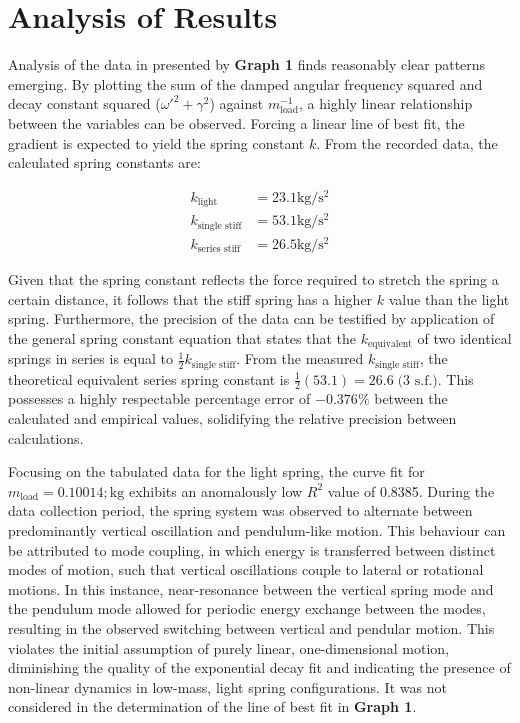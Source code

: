 \section{Analysis of Results}

Analysis of the data in presented by \textbf{Graph 1} finds reasonably clear patterns emerging. By plotting the sum of the damped angular frequency squared and decay constant squared ($\omega'^2 + \gamma^2$) against $m_{\text{load}}^{-1}$, a highly linear relationship between the variables can be observed. Forcing a linear line of best fit, the gradient is expected to yield the spring constant $k$. From the recorded data, the calculated spring constants are:

\vspace{-1em}

\begin{align*}
k_{\text{light}} &= 23.1 \si{\kilo\gram\per\second\squared} \\
k_{\text{single stiff}} &= 53.1 \si{\kilo\gram\per\second\squared} \\
k_{\text{series stiff}} &= 26.5 \si{\kilo\gram\per\second\squared}
\end{align*}

Given that the spring constant reflects the force required to stretch the spring a certain distance, it follows that the stiff spring has a higher $k$ value than the light spring. Furthermore, the precision of the data can be testified by application of the general spring constant equation that states that the $k_{\text{equivalent}}$ of two identical springs in series is equal to $\tfrac{1}{2}k_{\text{single stiff}}$. From the measured $k_{\text{single stiff}}$, the theoretical equivalent series spring constant is \linebreak$\tfrac{1}{2} \left( 53.1 \right) = 26.6 \; \text{(3 s.f.)}$. This possesses a highly respectable percentage error of $- 0.376 \%$ between the calculated and empirical values, solidifying the relative precision between calculations.

Focusing on the tabulated data for the light spring, the curve fit for $m_{\text{load}} = 0.10014 ; \si{\kilo\gram}$ exhibits an anomalously low $R^2$ value of 0.8385. During the data collection period, the spring system was observed to alternate between predominantly vertical oscillation and pendulum-like motion. This behaviour can be attributed to mode coupling, in which energy is transferred between distinct modes of motion, such that vertical oscillations couple to lateral or rotational motions. In this instance, near-resonance between the vertical spring mode and the pendulum mode allowed for periodic energy exchange between the modes, resulting in the observed switching between vertical and pendular motion. This violates the initial assumption of purely linear, one-dimensional motion, diminishing the quality of the exponential decay fit and indicating the presence of non-linear dynamics in low-mass, light spring configurations. It was not considered in the determination of the line of best fit in \textbf{Graph 1}.

